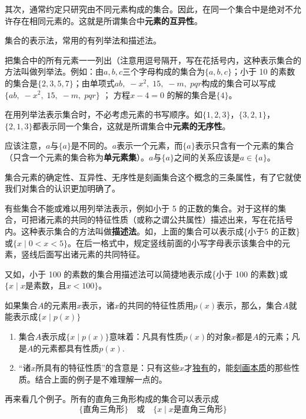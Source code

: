 其次，通常约定只研究由不同元素构成的集合。因此，在同一个集合中是绝对不允许存在相同元素的。这就是所谓集合中\textbf{元素的互异性}。

集合的表示法，常用的有列举法和描述法。

把集合中的所有元素一一列出（注意用逗号隔开，写在花括号内，这种表示集合的方法叫做列举法。例如：由$a,b,c$三个字母构成的集合为$\{a,b,c\}$；小于 10 的素数的集合是$\{ 2 , 3 , 5 , 7\}$；由单项式$ab,\; -x^2,\; 15,\; -m,\; pqr$构成的集合可以写成$\{ab,\; -x^2,\; 15,\; -m,\; pqr\}$
；
方程$x- 4 = 0$ 的解的集合是$\{4\}$。

在用列举法表示集合时，不必考虑元素的书写顺序。如$\{ 1 , 2 , 3 \}$，$\{ 3 , 2 , 1\}$，$\{2 , 1 , 3 \}$都表示同一个集合，这就是所谓集合中\textbf{元素的无序性}。

应该注意，$a$与$\{a\}$是不同的。$a$表示一个元素，而$\{a\}$表示只含有一个元素的集合（只含一个元素的集合称为\textbf{单元素集}）。$a$与$\{a\}$之间的关系应该是$a\in\{a\}$。

\begin{note}
    集合元素的确定性、互异性、无序性是刻画集合这个概念的三条属性，有了它就使我们对集合的认识更加明确了。
\end{note}

有些集合不能或难以用列举法表示，例如小于 5 的正数的集合。对于这样的集合，可把诸元素的共同的特征性质（或称之谓公共属性）描述出来，写在花括号内。这种表示集合的方法叫做\textbf{描述法}。如，上面的集合可以表示成\{小于5 的正数\}或$\{x\mid  0 <x< 5 \}$。在后一格式中，规定竖线前面的小写字母表示该集合中的元素，竖线后面写出诸元素的共同特征。

又如，小于 100 的素数的集合用描述法可以简捷地表示成\{小于 100 的素数\}或$\{x\mid x\text{是素数，且}x< 100\}$。

如果集合$A$的元素用$x$表示，诸$x$的共同的特征性质用$p(x)$表示，那么，集合$A$就能表示成$\{x\mid p(x)\}$

\begin{note}
\begin{enumerate}
    \item  集合$A$表示成$\{x\mid p(x)\}$意味着：凡具有性质$p(x)$的对象$x$都是$A$的元素；凡是$A$的元素都具有性质$p(x)$.
    \item “诸$x$所具有的特征性质”的含意是：只有这些$x$才\underline{独有}的，能\underline{刻画本质}的那些性质。结合上面的例子是不难理解一点的。
\end{enumerate}
\end{note}

再来看几个例子。所有的直角三角形构成的集合可以表示成
\[\text{\{直角三角形\}}\quad \text{或}\quad \{x\mid x\text{是直角三角形}\}\]

